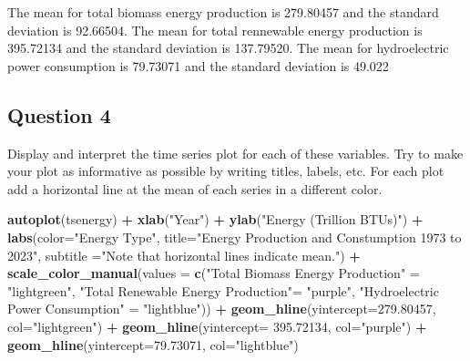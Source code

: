 \documentclass[
]{article}
\newenvironment{Shaded}{\begin{snugshade}}{\end{snugshade}}
\newcommand{\AttributeTok}[1]{\textcolor[rgb]{0.13,0.29,0.53}{#1}}
\newcommand{\FloatTok}[1]{\textcolor[rgb]{0.00,0.00,0.81}{#1}}
\newcommand{\FunctionTok}[1]{\textcolor[rgb]{0.13,0.29,0.53}{\textbf{#1}}}
\newcommand{\NormalTok}[1]{#1}
\newcommand{\OtherTok}[1]{\textcolor[rgb]{0.56,0.35,0.01}{#1}}
\newcommand{\SpecialCharTok}[1]{\textcolor[rgb]{0.81,0.36,0.00}{\textbf{#1}}}
\newcommand{\StringTok}[1]{\textcolor[rgb]{0.31,0.60,0.02}{#1}}
\begin{document}
The mean for total biomass energy production is 279.80457 and the
standard deviation is 92.66504. The mean for total rennewable energy
production is 395.72134 and the standard deviation is 137.79520. The
mean for hydroelectric power consumption is 79.73071 and the standard
deviation is 49.022

\hypertarget{question-4}{%
\subsection{Question 4}\label{question-4}}

Display and interpret the time series plot for each of these variables.
Try to make your plot as informative as possible by writing titles,
labels, etc. For each plot add a horizontal line at the mean of each
series in a different color.

\begin{Shaded}
\begin{Highlighting}[]
\FunctionTok{autoplot}\NormalTok{(tsenergy) }\SpecialCharTok{+}
  \FunctionTok{xlab}\NormalTok{(}\StringTok{"Year"}\NormalTok{) }\SpecialCharTok{+}
  \FunctionTok{ylab}\NormalTok{(}\StringTok{"Energy (Trillion BTUs)"}\NormalTok{) }\SpecialCharTok{+}
  \FunctionTok{labs}\NormalTok{(}\AttributeTok{color=}\StringTok{"Energy Type"}\NormalTok{, }\AttributeTok{title=}\StringTok{"Energy Production and Constumption 1973 to 2023"}\NormalTok{, }\AttributeTok{subtitle =}\StringTok{"Note that horizontal lines indicate mean."}\NormalTok{) }\SpecialCharTok{+}
  \FunctionTok{scale\_color\_manual}\NormalTok{(}\AttributeTok{values =} \FunctionTok{c}\NormalTok{(}\StringTok{"Total Biomass Energy Production"} \OtherTok{=} \StringTok{"lightgreen"}\NormalTok{, }\StringTok{"Total Renewable Energy Production"}\OtherTok{=} \StringTok{"purple"}\NormalTok{, }\StringTok{"Hydroelectric Power Consumption"} \OtherTok{=} \StringTok{"lightblue"}\NormalTok{)) }\SpecialCharTok{+}
                       \FunctionTok{geom\_hline}\NormalTok{(}\AttributeTok{yintercept=}\FloatTok{279.80457}\NormalTok{, }\AttributeTok{col=}\StringTok{"lightgreen"}\NormalTok{) }\SpecialCharTok{+}
  \FunctionTok{geom\_hline}\NormalTok{(}\AttributeTok{yintercept=} \FloatTok{395.72134}\NormalTok{, }\AttributeTok{col=}\StringTok{"purple"}\NormalTok{) }\SpecialCharTok{+}
  \FunctionTok{geom\_hline}\NormalTok{(}\AttributeTok{yintercept=}\FloatTok{79.73071}\NormalTok{, }\AttributeTok{col=}\StringTok{"lightblue"}\NormalTok{) }
\end{Highlighting}
\end{Shaded}
\end{document}
